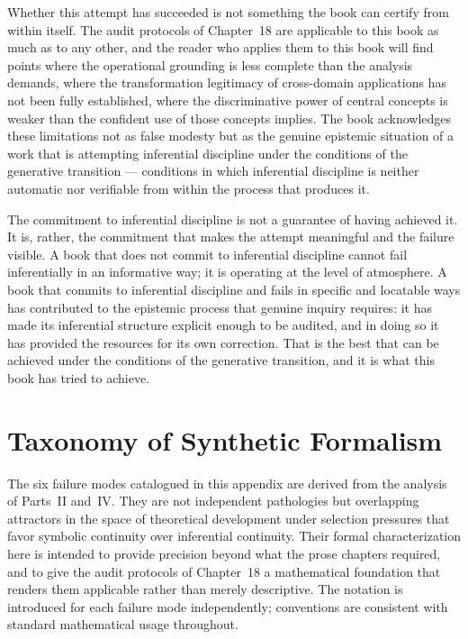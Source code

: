 \documentclass[12pt, openright, twoside]{book}
\begin{document}
Whether this attempt has succeeded is not something the book can certify
from within itself. The audit protocols of Chapter~18 are applicable
to this book as much as to any other, and the reader who applies them
to this book will find points where the operational grounding is less
complete than the analysis demands, where the transformation legitimacy
of cross-domain applications has not been fully established, where the
discriminative power of central concepts is weaker than the confident
use of those concepts implies. The book acknowledges these limitations
not as false modesty but as the genuine epistemic situation of a work
that is attempting inferential discipline under the conditions of the
generative transition --- conditions in which inferential discipline
is neither automatic nor verifiable from within the process that
produces it.

The commitment to inferential discipline is not a guarantee of having
achieved it. It is, rather, the commitment that makes the attempt
meaningful and the failure visible. A book that does not commit to
inferential discipline cannot fail inferentially in an informative
way; it is operating at the level of atmosphere. A book that commits
to inferential discipline and fails in specific and locatable ways
has contributed to the epistemic process that genuine inquiry requires:
it has made its inferential structure explicit enough to be audited,
and in doing so it has provided the resources for its own correction.
That is the best that can be achieved under the conditions of the
generative transition, and it is what this book has tried to achieve.

\clearpage

\appendix
\chapter{Taxonomy of Synthetic Formalism}

The six failure modes catalogued in this appendix are derived from the
analysis of Parts~II and~IV. They are not independent pathologies but
overlapping attractors in the space of theoretical development under
selection pressures that favor symbolic continuity over inferential
continuity. Their formal characterization here is intended to provide
precision beyond what the prose chapters required, and to give the audit
protocols of Chapter~18 a mathematical foundation that renders them
applicable rather than merely descriptive. The notation is introduced
for each failure mode independently; conventions are consistent with
standard mathematical usage throughout.
\end{document}
